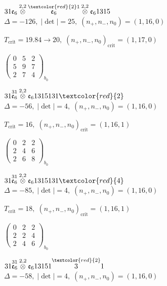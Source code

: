 \documentclass[10pt]{article}
\begin{document}
\smallskip

$31\mathfrak{e}_6\overset{2,2}{\otimes}\overset{\textcolor{red}{2}1}{\mathfrak{e}_6}\overset{2,2}{\otimes}\mathfrak{e}_61315$ \quad $\Delta=-126,\; |\det|=25,\; (n_+,n_-,n_0)=(1,16,0)$

\hspace{1em}$T_{\text{crit}}=19.84 \to 20,\; (n_+,n_-,n_0)_{\text{crit}}=(1,17,0)$

\hspace{2em}$\left(\begin{smallmatrix}0 & 5 & 2 \\ 5 & 9 & 7 \\ 2 & 7 & 4\end{smallmatrix}\right)_{\!b_0}$

\smallskip

$31\overset{31}{\mathfrak{e}_6}\overset{2,2}{\otimes}\mathfrak{e}_61315131\textcolor{red}{2}$ \quad $\Delta=-56,\; |\det|=4,\; (n_+,n_-,n_0)=(1,16,0)$

\hspace{1em}$T_{\text{crit}}=16,\; (n_+,n_-,n_0)_{\text{crit}}=(1,16,1)$

\hspace{2em}$\left(\begin{smallmatrix}0 & 2 & 2 \\ 2 & 4 & 6 \\ 2 & 6 & 8\end{smallmatrix}\right)_{\!b_0}$

$31\overset{31}{\mathfrak{e}_6}\overset{2,2}{\otimes}\mathfrak{e}_61315131\textcolor{red}{4}$ \quad $\Delta=-85,\; |\det|=4,\; (n_+,n_-,n_0)=(1,16,0)$

\hspace{1em}$T_{\text{crit}}=18,\; (n_+,n_-,n_0)_{\text{crit}}=(1,16,1)$

\hspace{2em}$\left(\begin{smallmatrix}0 & 2 & 2 \\ 2 & 2 & 4 \\ 2 & 4 & 6\end{smallmatrix}\right)_{\!b_0}$

$31\overset{31}{\mathfrak{e}_6}\overset{2,2}{\otimes}\mathfrak{e}_613151\overset{\textcolor{red}{2}}{3}1$ \quad $\Delta=-58,\; |\det|=4,\; (n_+,n_-,n_0)=(1,16,0)$
\end{document}
